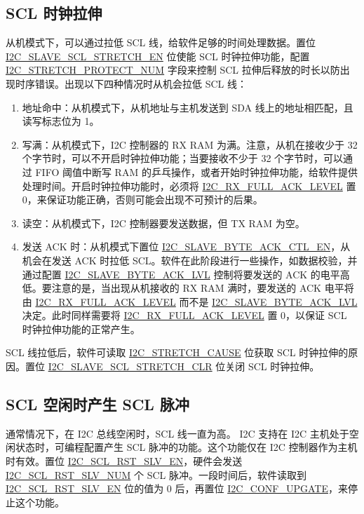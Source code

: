 \documentclass[main\_\_CN.tex]{subfiles}
\begin{document}
\subsection{SCL 时钟拉伸}
从机模式下，可以通过拉低 SCL 线，给软件足够的时间处理数据。置位 \hyperref[fielddesc:I2CSLAVESCLSTRETCHEN]{I2C\_SLAVE\_SCL\_STRETCH\_EN} 位使能 SCL 时钟拉伸功能，配置 \hyperref[fielddesc:I2CSTRETCHPROTECTNUM]{I2C\_STRETCH\_PROTECT\_NUM} 字段来控制 SCL 拉伸后释放的时长以防出现时序错误。出现以下四种情况时从机会拉低 SCL 线：

\begin{enumerate}
\item 地址命中：从机模式下，从机地址与主机发送到 SDA 线上的地址相匹配，且读写标志位为 1。
\item 写满：从机模式下，I2C 控制器的 RX RAM 为满。注意，从机在接收少于 32 个字节时，可以不开启时钟拉伸功能；当要接收不少于 32 个字节时，可以通过 FIFO 阈值中断写 RAM 的乒乓操作，或者开始时钟拉伸功能，给软件提供处理时间。开启时钟拉伸功能时，必须将 \hyperref[fielddesc:I2CRXFULLACKLEVEL]{I2C\_RX\_FULL\_ACK\_LEVEL} 置 0，来保证功能正确，否则可能会出现不可预计的后果。
\item 读空：从机模式下，I2C 控制器要发送数据，但 TX RAM 为空。
\item 发送 ACK 时：从机模式下置位 \hyperref[fielddesc:I2CSLAVEBYTEACKCTLEN]{I2C\_SLAVE\_BYTE\_ACK\_CTL\_EN}，从机会在发送 ACK 时拉低 SCL。软件在此阶段进行一些操作，如数据校验，并通过配置 \hyperref[fielddesc:I2CSLAVEBYTEACKLVL]{I2C\_SLAVE\_BYTE\_ACK\_LVL} 控制将要发送的 ACK 的电平高低。要注意的是，当出现从机接收的 RX RAM 满时，要发送的 ACK 电平将由 \hyperref[fielddesc:I2CRXFULLACKLEVEL]{I2C\_RX\_FULL\_ACK\_LEVEL} 而不是 \hyperref[fielddesc:I2CSLAVEBYTEACKLVL]{I2C\_SLAVE\_BYTE\_ACK\_LVL} 决定。此时同样需要将 \hyperref[fielddesc:I2CRXFULLACKLEVEL]{I2C\_RX\_FULL\_ACK\_LEVEL} 置 0，以保证 SCL 时钟拉伸功能的正常产生。
\end{enumerate}

SCL 线拉低后，软件可读取 \hyperref[fielddesc:I2CSTRETCHCAUSE]{I2C\_STRETCH\_CAUSE} 位获取 SCL 时钟拉伸的原因。置位 \hyperref[fielddesc:I2CSLAVESCLSTRETCHCLR]{I2C\_SLAVE\_SCL\_STRETCH\_CLR} 位关闭 SCL 时钟拉伸。

\subsection{SCL 空闲时产生 SCL 脉冲}
通常情况下，在 I2C 总线空闲时，SCL 线一直为高。\chipname{} I2C 支持在 I2C 主机处于空闲状态时，可编程配置产生 SCL 脉冲的功能。这个功能仅在 I2C 控制器作为主机时有效。置位 \hyperref[fielddesc:I2CSCLRSTSLVEN]{I2C\_SCL\_RST\_SLV\_EN}，硬件会发送 \hyperref[fielddesc:I2CSCLRSTSLVNUM]{I2C\_SCL\_RST\_SLV\_NUM} 个 SCL 脉冲。一段时间后，软件读取到 \hyperref[fielddesc:I2CSCLRSTSLVEN]{I2C\_SCL\_RST\_SLV\_EN} 位的值为 0 后，再置位 \hyperref[fielddesc:I2CCONFUPGATE]{I2C\_CONF\_UPGATE}，来停止这个功能。
\end{document}
